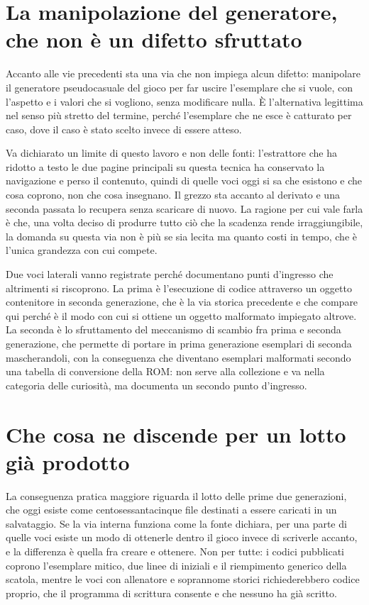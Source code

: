 \section{La manipolazione del generatore, che non è un difetto sfruttato}

Accanto alle vie precedenti sta una via che non impiega alcun difetto: manipolare il generatore pseudocasuale del gioco per far uscire l'esemplare che si vuole, con l'aspetto e i valori che si vogliono, senza modificare nulla. È l'alternativa legittima nel senso più stretto del termine, perché l'esemplare che ne esce è catturato per caso, dove il caso è stato scelto invece di essere atteso.

Va dichiarato un limite di questo lavoro e non delle fonti: l'estrattore che ha ridotto a testo le due pagine principali su questa tecnica ha conservato la navigazione e perso il contenuto, quindi di quelle voci oggi si sa che esistono e che cosa coprono, non che cosa insegnano. Il grezzo sta accanto al derivato e una seconda passata lo recupera senza scaricare di nuovo. La ragione per cui vale farla è che, una volta deciso di produrre tutto ciò che la scadenza rende irraggiungibile, la domanda su questa via non è più se sia lecita ma quanto costi in tempo, che è l'unica grandezza con cui compete.

Due voci laterali vanno registrate perché documentano punti d'ingresso che altrimenti si riscoprono. La prima è l'esecuzione di codice attraverso un oggetto contenitore in seconda generazione, che è la via storica precedente e che compare qui perché è il modo con cui si ottiene un oggetto malformato impiegato altrove. La seconda è lo sfruttamento del meccanismo di scambio fra prima e seconda generazione, che permette di portare in prima generazione esemplari di seconda mascherandoli, con la conseguenza che diventano esemplari malformati secondo una tabella di conversione della ROM: non serve alla collezione e va nella categoria delle curiosità, ma documenta un secondo punto d'ingresso.

\section{Che cosa ne discende per un lotto già prodotto}

La conseguenza pratica maggiore riguarda il lotto delle prime due generazioni, che oggi esiste come centosessantacinque file destinati a essere caricati in un salvataggio. Se la via interna funziona come la fonte dichiara, per una parte di quelle voci esiste un modo di ottenerle dentro il gioco invece di scriverle accanto, e la differenza è quella fra creare e ottenere. Non per tutte: i codici pubblicati coprono l'esemplare mitico, due linee di iniziali e il riempimento generico della scatola, mentre le voci con allenatore e soprannome storici richiederebbero codice proprio, che il programma di scrittura consente e che nessuno ha già scritto.

